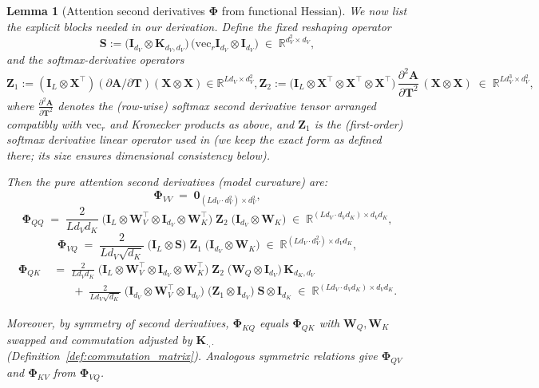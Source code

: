 \documentclass{article}
\newtheorem{lemma}{Lemma}
\begin{document}
\begin{lemma}[Attention second derivatives $\boldsymbol{\Phi}$ from functional Hessian]
We now list the explicit blocks needed in our derivation. Define the fixed reshaping operator
\[
\mathbf{S} := \big(\mathbf{I}_{d_V} \otimes \mathbf{K}_{d_V, d_V}\big)\, \big(\mathrm{vec}_r \mathbf{I}_{d_V} \otimes \mathbf{I}_{d_V}\big)
\;\in\; \mathbb{R}^{d_V^2 \times d_V},
\]
and the softmax-derivative operators
\[
\mathbf{Z}_1 := (\mathbf{I}_L \otimes \mathbf{X}^\top)(\partial\mathbf{A}/\partial\mathbf{T})(\mathbf{X} \otimes \mathbf{X}) \in \mathbb{R}^{Ld_V \times d_V^2},
\mathbf{Z}_2 := \big(\mathbf{I}_L \otimes \mathbf{X}^\top \otimes \mathbf{X}^\top \otimes \mathbf{X}^\top\big)\,
\frac{\partial^2 \mathbf{A}}{\partial \mathbf{T}^2}\,
(\mathbf{X} \otimes \mathbf{X})
\;\in\; \mathbb{R}^{L d_V^3 \times d_V^2},
\]
where $\tfrac{\partial^2 \mathbf{A}}{\partial \mathbf{T}^2}$ denotes the (row-wise) softmax second derivative tensor arranged compatibly with $\mathrm{vec}_r$ and Kronecker products as above, and $\mathbf{Z}_1$ is the (first-order) softmax derivative linear operator used in \cite{ormaniec2024attentionhessian} (we keep the exact form as defined there; its size ensures dimensional consistency below).

Then the pure attention second derivatives (model curvature) are:
\[
\boldsymbol{\Phi}_{VV} \;=\; \mathbf{0}_{(L d_V \cdot d_V^2) \times d_V^2},
\]
\[
\boldsymbol{\Phi}_{QQ} \;=\; \frac{2}{L d_V d_K}\;
\big(\mathbf{I}_L \otimes \mathbf{W}_V^\top \otimes \mathbf{I}_{d_V} \otimes \mathbf{W}_K^\top\big)\;
\mathbf{Z}_2\;
\big(\mathbf{I}_{d_V} \otimes \mathbf{W}_K\big)
\;\in\; \mathbb{R}^{(L d_V \cdot d_V d_K) \times d_V d_K},
\]
\[
\boldsymbol{\Phi}_{VQ} \;=\; \frac{2}{L d_V \sqrt{d_K}}\;
\big(\mathbf{I}_L \otimes \mathbf{S}\big)\;
\mathbf{Z}_1\;
\big(\mathbf{I}_{d_V} \otimes \mathbf{W}_K\big)
\;\in\; \mathbb{R}^{(L d_V \cdot d_V^2) \times d_V d_K},
\]
\begin{align*}
\boldsymbol{\Phi}_{QK}
&\;=\; \frac{2}{L d_V d_K}\;
\big(\mathbf{I}_L \otimes \mathbf{W}_V^\top \otimes \mathbf{I}_{d_V} \otimes \mathbf{W}_K^\top\big)\;
\mathbf{Z}_2\;
\big(\mathbf{W}_Q \otimes \mathbf{I}_{d_V}\big)\, \mathbf{K}_{d_K, d_V} \\
&\qquad +\; \frac{2}{L d_V \sqrt{d_K}}\;
\big(\mathbf{I}_{d_V} \otimes \mathbf{W}_V^\top \otimes \mathbf{I}_{d_V}\big)\;
\big(\mathbf{Z}_1 \otimes \mathbf{I}_{d_V}\big)\; \mathbf{S} \otimes \mathbf{I}_{d_K} \;\in\; \mathbb{R}^{(L d_V \cdot d_V d_K) \times d_V d_K}.
\end{align*}

Moreover, by symmetry of second derivatives, $\boldsymbol{\Phi}_{KQ}$ equals $\boldsymbol{\Phi}_{QK}$ with $\mathbf{W}_Q,\mathbf{W}_K$ swapped and commutation adjusted by $\mathbf{K}_{\cdot,\cdot}$ (Definition~\ref{def:commutation_matrix}). Analogous symmetric relations give $\boldsymbol{\Phi}_{QV}$ and $\boldsymbol{\Phi}_{KV}$ from $\boldsymbol{\Phi}_{VQ}$.
\end{lemma}
\end{document}
